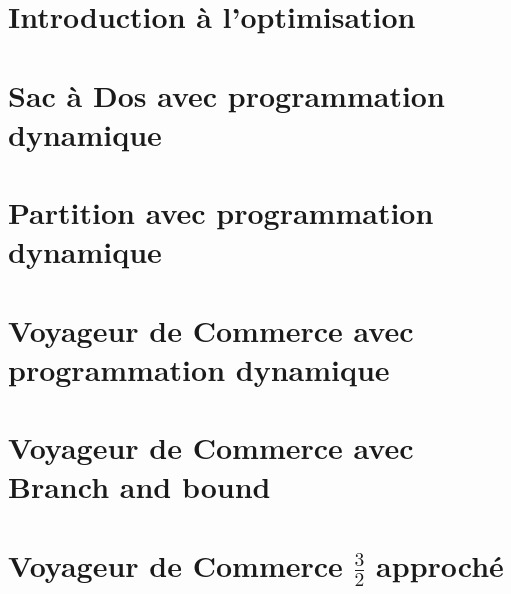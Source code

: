 \section{Introduction à l'optimisation}

\clearpage

\section{Sac à Dos avec programmation dynamique}

\clearpage

\section{Partition avec programmation dynamique}

\clearpage

\section{Voyageur de Commerce avec programmation dynamique}

\clearpage


\section{Voyageur de Commerce avec Branch and bound}

\clearpage


\section{Voyageur de Commerce $\frac{3}{2}$ approché}

\pagebreak